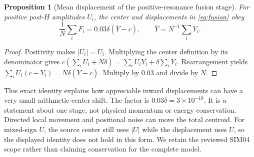 \documentclass[11pt,a4paper]{article}
\newtheorem{proposition}{Proposition}
\begin{document}
\begin{proposition}[Mean displacement of the positive-resonance fusion stage]\label{prop:centroid}
For positive post-$H$ amplitudes $U_i$, the center and displacements in \eqref{eq:fusion} obey
\begin{equation}
\frac1N\sum_iF_i=0.03\delta(\bar Y-c),\qquad \bar Y=N^{-1}\sum_iY_i.\label{eq:centroid}
\end{equation}
\end{proposition}
\begin{proof}
Positivity makes $|U_i|=U_i$. Multiplying the center definition by its denominator gives $c(\sum_iU_i+N\delta)=\sum_iU_iY_i+\delta\sum_iY_i$. Rearrangement yields $\sum_iU_i(c-Y_i)=N\delta(\bar Y-c)$. Multiply by 0.03 and divide by $N$.
\end{proof}
This exact identity explains how appreciable inward displacements can have a very small arithmetic-center shift. The factor is $0.03\delta=3\times10^{-10}$. It is a statement about one stage, not physical momentum or energy conservation. Directed local movement and positional noise can move the total centroid. For mixed-sign $U$, the source center still uses $|U|$ while the displacement uses $U$, so the displayed identity does not hold in this form. We retain the reviewed SIM04 scope rather than claiming conservation for the complete model.
\end{document}
